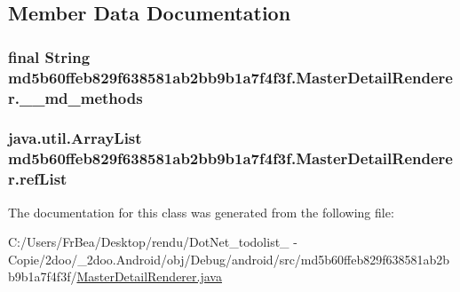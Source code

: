 \subsection{Member Data Documentation}
\hypertarget{classmd5b60ffeb829f638581ab2bb9b1a7f4f3f_1_1_master_detail_renderer_ce7bfaacfb9e54f304255e32cc2b83de}{
\subsubsection[{\_\-\_\-md\_\-methods}]{\setlength{\rightskip}{0pt plus 5cm}final String {\bf md5b60ffeb829f638581ab2bb9b1a7f4f3f.MasterDetailRenderer.\_\-\_\-md\_\-methods}}}
\label{classmd5b60ffeb829f638581ab2bb9b1a7f4f3f_1_1_master_detail_renderer_ce7bfaacfb9e54f304255e32cc2b83de}


\hypertarget{classmd5b60ffeb829f638581ab2bb9b1a7f4f3f_1_1_master_detail_renderer_30c285665b3a72e9c0975bf43b4f8210}{
\subsubsection[{refList}]{\setlength{\rightskip}{0pt plus 5cm}java.util.ArrayList {\bf md5b60ffeb829f638581ab2bb9b1a7f4f3f.MasterDetailRenderer.refList}}}
\label{classmd5b60ffeb829f638581ab2bb9b1a7f4f3f_1_1_master_detail_renderer_30c285665b3a72e9c0975bf43b4f8210}




The documentation for this class was generated from the following file:\begin{CompactItemize}
\item 
C:/Users/FrBea/Desktop/rendu/DotNet\_\-todolist\_ - Copie/2doo/\_\-2doo.Android/obj/Debug/android/src/md5b60ffeb829f638581ab2bb9b1a7f4f3f/\hyperlink{_master_detail_renderer_8java}{MasterDetailRenderer.java}\end{CompactItemize}
